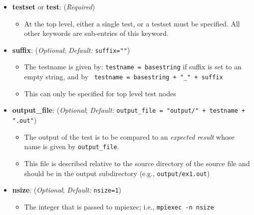 \begin{itemize}

  \item[] \textbf{testset} or \textbf{test}: (\emph{Required})

    \begin{itemize}

      \item[] At the top level, either a single test, or a testset must
            be specified.   All other keywords are sub-entries of this keyword.

    \end{itemize}

  \item[]  \textbf{suffix}: (\emph{Optional}; \emph{Default:} \lstinline{suffix=""})
    \begin{itemize}

      \item The testname is given by: \lstinline{testname = basestring} if suffix is set to an empty string, and by \lstinline{ testname = basestring + "_" + suffix}

      \item This can only be specified for top level test nodes

     \end{itemize}


   \item[]  \textbf{output\_file}: (\emph{Optional}; \emph{Default:}
                 \lstinline{output_file = "output/" + testname + ".out"})
      \begin{itemize}

      \item The output of the test is to be compared to an \emph{expected result}
      whose name is given by \lstinline{output_file}.

      \item This file is described relative to the source directory of the
      source file and should be in the output subdirectory (e.g.,
      \lstinline{output/ex1.out})

      \end{itemize}


    \item[]  \textbf{nsize}: (\emph{Optional}; \emph{Default:} \lstinline{nsize=1})
      \begin{itemize}

      \item The integer that is passed to mpiexec; i.e., \lstinline{mpiexec -n nsize}


\end{itemize}
\end{itemize}
